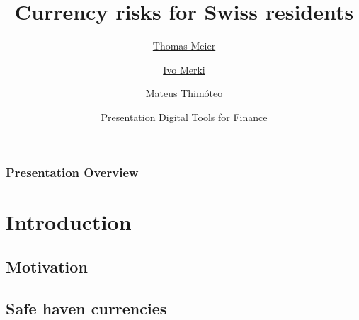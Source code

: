 \documentclass[11pt,]{beamer}
\title[Currency risks CH residents]{Currency risks for Swiss residents}
\author[Meier \and Merki \and Thimóteo]{\href{mailto:thomaswilhelm.meier@uzh.ch}{Thomas Meier} \and \href{mailto:ivo.merki@uzh.ch}{Ivo Merki} \and \href{mailto:mateus.siqueirathimoteo@uzh.ch}{Mateus Thimóteo}}
\institute[UZH]{University of Zurich \\ \smallskip}
\date[December 22, 2023]{Presentation Digital Tools for Finance \\ \smallskip {\footnotesize December 22, 2023}}
\begin{document}
\begin{frame}
	\titlepage
\end{frame}
\begin{frame}
	\frametitle{Presentation Overview}
    \tableofcontents 
\end{frame}
\section{Introduction}
\subsection{Motivation}
\subsection{Safe haven currencies}
\end{document}
